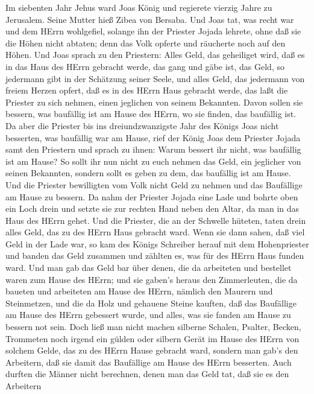  Im siebenten Jahr Jehus ward Joas König und regierete
vierzig Jahre zu Jerusalem. Seine Mutter hieß Zibea von Bersaba.
 Und Joas tat, was recht war und dem HErrn wohlgefiel,
solange ihn der Priester Jojada lehrete,  ohne daß sie die
Höhen nicht abtaten; denn das Volk opferte und räucherte noch auf den
Höhen.  Und Joas sprach zu den Priestern: Alles Geld, das
geheiliget wird, daß es in das Haus des HErrn gebracht werde, das gang
und gäbe ist, das Geld, so jedermann gibt in der Schätzung seiner Seele,
und alles Geld, das jedermann von freiem Herzen opfert, daß es in des
HErrn Haus gebracht werde,  das laßt die Priester zu sich
nehmen, einen jeglichen von seinem Bekannten. Davon sollen sie bessern,
was baufällig ist am Hause des HErrn, wo sie finden, das baufällig ist.
 Da aber die Priester bis ins dreiundzwanzigste Jahr des
Königs Joas nicht besserten, was baufällig war am Hause, 
rief der König Joas dem Priester Jojada samt den Priestern und sprach zu
ihnen: Warum bessert ihr nicht, was baufällig ist am Hause? So sollt ihr
nun nicht zu euch nehmen das Geld, ein jeglicher von seinen Bekannten,
sondern sollt es geben zu dem, das baufällig ist am Hause. 
Und die Priester bewilligten vom Volk nicht Geld zu nehmen und das
Baufällige am Hause zu bessern.  Da nahm der Priester Jojada
eine Lade und bohrte oben ein Loch drein und setzte sie zur rechten Hand
neben den Altar, da man in das Haus des HErrn gehet. Und die Priester,
die an der Schwelle hüteten, taten drein alles Geld, das zu des HErrn
Haus gebracht ward.  Wenn sie dann sahen, daß viel Geld in
der Lade war, so kam des Königs Schreiber herauf mit dem Hohenpriester
und banden das Geld zusammen und zählten es, was für des HErrn Haus
funden ward.  Und man gab das Geld bar über denen, die da
arbeiteten und bestellet waren zum Hause des HErrn; und sie gaben's
heraus den Zimmerleuten, die da baueten und arbeiteten am Hause des
HErrn,  nämlich den Maurern und Steinmetzen, und die da
Holz und gehauene Steine kauften, daß das Baufällige am Hause des HErrn
gebessert wurde, und alles, was sie fanden am Hause zu bessern not sein.
 Doch ließ man nicht machen silberne Schalen, Psalter,
Becken, Trommeten noch irgend ein gülden oder silbern Gerät im Hause des
HErrn von solchem Gelde, das zu des HErrn Hause gebracht ward,
 sondern man gab's den Arbeitern, daß sie damit das
Baufällige am Hause des HErrn besserten.  Auch durften die
Männer nicht berechnen, denen man das Geld tat, daß sie es den Arbeitern
